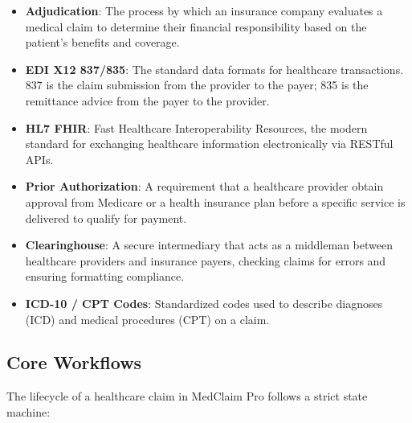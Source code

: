\documentclass[
  11pt,
  openany,
  oneside]{book}
\providecommand{\tightlist}{%
  \setlength{\itemsep}{0pt}\setlength{\parskip}{0pt}}
\begin{document}
\begin{itemize}
\tightlist
\item
  \textbf{Adjudication}: The process by which an insurance company
  evaluates a medical claim to determine their financial responsibility
  based on the patient's benefits and coverage.
\item
  \textbf{EDI X12 837/835}: The standard data formats for healthcare
  transactions. 837 is the claim submission from the provider to the
  payer; 835 is the remittance advice from the payer to the provider.
\item
  \textbf{HL7 FHIR}: Fast Healthcare Interoperability Resources, the
  modern standard for exchanging healthcare information electronically
  via RESTful APIs.
\item
  \textbf{Prior Authorization}: A requirement that a healthcare provider
  obtain approval from Medicare or a health insurance plan before a
  specific service is delivered to qualify for payment.
\item
  \textbf{Clearinghouse}: A secure intermediary that acts as a middleman
  between healthcare providers and insurance payers, checking claims for
  errors and ensuring formatting compliance.
\item
  \textbf{ICD-10 / CPT Codes}: Standardized codes used to describe
  diagnoses (ICD) and medical procedures (CPT) on a claim.
\end{itemize}

\subsection{Core Workflows}\label{core-workflows}

The lifecycle of a healthcare claim in MedClaim Pro follows a strict
state machine:
\end{document}
